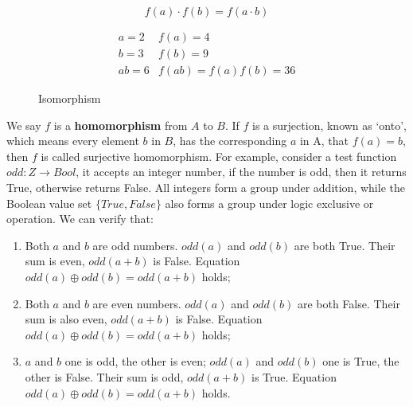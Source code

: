 \documentclass[b5paper]{article}
\begin{document}
\[
f(a) \cdot f(b) = f(a \cdot b)
\]

\begin{figure}[htbp]
\centering
{}
\[
\begin{array}{rl}
a = 2 & f(a) = 4 \\
b = 3 & f(b) = 9 \\
ab = 6 & f(ab) = f(a)f(b) = 36
\end{array}
\]
\caption{Isomorphism}
\label{fig:isomorphism}
\end{figure}

We say $f$ is a \textbf{homomorphism} from $A$ to $B$. If $f$ is a surjection, known as `onto', which means every element $b$ in $B$, has the corresponding $a$ in A, that $f(a) = b$, then $f$ is called surjective homomorphism. For example, consider a test function $odd: Z \to Bool$, it accepts an integer number, if the number is odd, then it returns True, otherwise returns False. All integers form a group under addition, while the Boolean value set $\{True, False\}$ also forms a group under logic exclusive or operation. We can verify that:

\begin{enumerate}
\item Both $a$ and $b$ are odd numbers. $odd(a)$ and $odd(b)$ are both True. Their sum is even, $odd(a+b)$ is False. Equation $odd(a) \oplus odd(b) = odd(a+b)$ holds;
\item Both $a$ and $b$ are even numbers. $odd(a)$ and $odd(b)$ are both False. Their sum is also even, $odd(a+b)$ is False. Equation $odd(a) \oplus odd(b) = odd(a+b)$ holds;
\item $a$ and $b$ one is odd, the other is even; $odd(a)$ and $odd(b)$ one is True, the other is False. Their sum is odd, $odd(a+b)$ is True. Equation $odd(a) \oplus odd(b) = odd(a+b)$ holds.
\end{enumerate}
\end{document}
